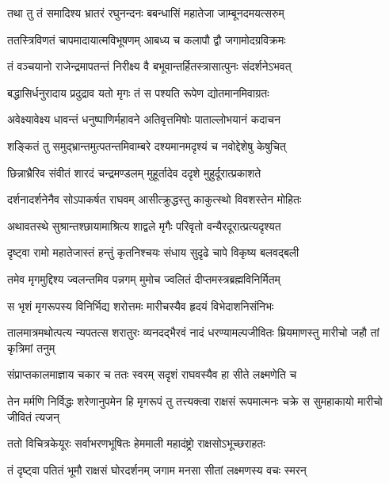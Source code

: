 \twolineshloka
{तथा तु तं समादिश्य भ्रातरं रघुनन्दनः}
{बबन्धासिं महातेजा जाम्बूनदमयत्सरुम्} %

\twolineshloka
{ततस्त्रिविणतं चापमादायात्मविभूषणम्}
{आबध्य च कलापौ द्वौ जगामोदग्रविक्रमः} %

\twolineshloka
{तं वञ्चयानो राजेन्द्रमापतन्तं निरीक्ष्य वै}
{बभूवान्तर्हितस्त्रासात्पुनः संदर्शनेऽभवत्} %

\twolineshloka
{बद्धासिर्धनुरादाय प्रदुद्राव यतो मृगः}
{तं स पश्यति रूपेण द्योतमानमिवाग्रतः} %

\twolineshloka
{अवेक्ष्यावेक्ष्य धावन्तं धनुष्पाणिर्महावने}
{अतिवृत्तमिषोः पाताल्लोभयानं कदाचन} %

\twolineshloka
{शङ्कितं तु समुद्भ्रान्तमुत्पतन्तमिवाम्बरे}
{दश्यमानमदृश्यं च नवोद्देशेषु केषुचित्} %

\twolineshloka
{छिन्नाभ्रैरिव संवीतं शारदं चन्द्रमण्डलम्}
{मुहूर्तादेव ददृशे मुहुर्दूरात्प्रकाशते} %

\twolineshloka
{दर्शनादर्शनेनैव सोऽपाकर्षत राघवम्}
{आसीत्क्रुद्धस्तु काकुत्स्थो विवशस्तेन मोहितः} %

\twolineshloka
{अथावतस्थे सुश्रान्तश्छायामाश्रित्य शाद्वले}
{मृगैः परिवृतो वन्यैरदूरात्प्रत्यदृश्यत} %

\twolineshloka
{दृष्ट्वा रामो महातेजास्तं हन्तुं कृतनिश्चयः}
{संधाय सुदृढे चापे विकृष्य बलवद्बली} %

\twolineshloka
{तमेव मृगमुद्दिश्य ज्वलन्तमिव पन्नगम्}
{मुमोच ज्वलितं दीप्तमस्त्रब्रह्मविनिर्मितम्} %

\twolineshloka
{स भृशं मृगरूपस्य विनिर्भिद्य शरोत्तमः}
{मारीचस्यैव हृदयं विभेदाशनिसंनिभः} %

\threelineshloka
{तालमात्रमथोत्पत्य न्यपतत्स शरातुरः}
{व्यनदद्भैरवं नादं धरण्यामल्पजीवितः}
{म्रियमाणस्तु मारीचो जहौ तां कृत्रिमां तनुम्} %

\twolineshloka
{संप्राप्तकालमाज्ञाय चकार च ततः स्वरम्}
{सदृशं राघवस्यैव हा सीते लक्ष्मणेति च} %

\threelineshloka
{तेन मर्मणि निर्विद्धः शरेणानुपमेन हि}
{मृगरूपं तु तत्त्यक्त्वा राक्षसं रूपमात्मनः}
{चक्रे स सुमहाकायो मारीचो जीवितं त्यजन्} %

\twolineshloka
{ततो विचित्रकेयूरः सर्वाभरणभूषितः}
{हेममाली महादंष्ट्रो राक्षसोऽभूच्छराहतः} %

\twolineshloka
{तं दृष्ट्वा पतितं भूमौ राक्षसं घोरदर्शनम्}
{जगाम मनसा सीतां लक्ष्मणस्य वचः स्मरन्} %

